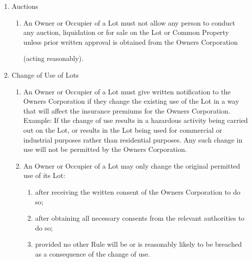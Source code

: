 \documentclass{article}
\begin{document}
\begin{enumerate}[label=\arabic*.]
\begin{enumerate}[label=\arabic{enumi}.\arabic*.]
\begin{enumerate}[label=\arabic{enumi}.\arabic*.]
\begin{enumerate}[label=(\arabic*)]
\begin{enumerate}[label=(\alph*)]
\item  act reasonably to minimise any inconvenience.

\end{enumerate}

\end{enumerate}

\item  Auctions

\begin{enumerate}[label=(\arabic*)]

\item  An Owner or Occupier of a Lot must not allow any person to conduct any auction, liquidation or for sale on the Lot or Common Property unless prior written approval is obtained from the Owners Corporation

(acting reasonably).

\end{enumerate}

\item  Change of Use of Lots

\begin{enumerate}[label=(\arabic*)]

\item  An Owner or Occupier of a Lot must give written notification to the Owners Corporation if they change the existing use of the Lot in a way that will affect the insurance premiums for the Owners Corporation. Example: If the change of use results in a hazardous activity being carried out on the Lot, or results in the Lot being used for commercial or industrial purposes rather than residential purposes. Any such change in use will not be permitted by the Owners Corporation.

\item  An Owner or Occupier of a Lot may only change the original permitted use of its Lot:

\begin{enumerate}[label=(\alph*)]

\item  after receiving the written consent of the Owners Corporation to do so;

\item  after obtaining all necessary consents from the relevant authorities to do so;

\item  provided no other Rule will be or is reasonably likely to be breached as a consequence of the change of use.

\end{enumerate}


\end{enumerate}
\end{enumerate}
\end{enumerate}
\end{enumerate}
\end{document}
